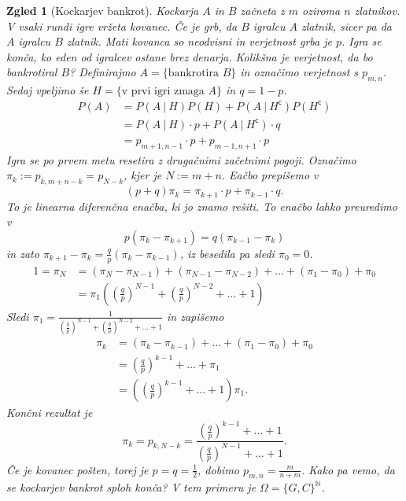 \documentclass[10pt, a4paper]{article}
\newtheorem{zgled}[izr]{Zgled}
\newcommand{\stcomp}[1]{{#1}^{\mathsf{c}}}
\newcommand{\N}{\mathbb {N}}
\begin{document}
\begin{zgled}[Kockarjev bankrot]
  Kockarja $A$ in $B$ začneta z $m$ oziroma $n$ zlatnikov.
  V vsaki rundi igre vržeta kovanec.
  Če je grb, da $B$ igralcu $A$ zlatnik, sicer pa da $A$ igralcu $B$ zlatnik.
  Mati kovanca so neodvisni in verjetnost grba je $p$.
  Igra se konča, ko eden od igralcev ostane brez denarja. Kolikšna je verjetnost, da bo bankrotiral $B$?
  Definirajmo $A = \{\text{bankrotira $B$}\}$ in označimo verjetnost s $p_{m, n}$.
  Sedaj vpeljimo še $H = \{\text{v prvi igri zmaga $A$}\}$ in $q = 1 - p$.
  \begin{align*}
    P(A) &= P(A\ |\ H) P(H) + P(A\ |\ \stcomp{H}) P(\stcomp{H})\\
    &= P(A\ |\ H) \cdot p + P(A\ |\ \stcomp{H}) \cdot q\\
    &= p_{m + 1, n - 1} \cdot p + p_{m -1, n + 1} \cdot p
  \end{align*}
  Igra se po prvem metu resetira z drugačnimi začetnimi pogoji.
  Označimo $\pi_k := p_{k, m + n - k} = p_{N - k}$, kjer je $N := m + n$.
  Eačbo prepišemo v 
  $$(p + q) \pi_k = \pi_{k + 1} \cdot p + \pi_{k - 1} \cdot q.$$
  To je linearna diferenčna enačba, ki jo znamo rešiti. To enačbo lahko preuredimo v 
  $$p( \pi_k - \pi_{k + 1})  = q (\pi_{k - 1}  - \pi_k)$$
  in zato $\pi_{k + 1} - \pi_k = \frac{q}{p} (\pi_k  - \pi_{k - 1})$, iz besedila pa sledi $\pi_0 = 0$.
  \begin{align*}
    1 = \pi_N &= (\pi_N - \pi_{N - 1}) + (\pi_{N - 1} - \pi_{N - 2}) + \dots + (\pi_1 - \pi_0) + \pi_0\\
    &= \pi_1 \left(\left(\frac{q}{p}\right)^{N - 1} + \left(\frac{q}{p}\right)^{N - 2} + \dots + 1\right)
  \end{align*}
  Sledi $\pi_1 = \frac{1}{\left(\frac{q}{p}\right)^{N - 1} + \left(\frac{q}{p}\right)^{N - 2} + \dots + 1}$
  in zapišemo 
  \begin{align*}
    \pi_k &= (\pi_k - \pi_{k - 1}) + \dots + (\pi_1 - \pi_0) + \pi_0\\
    &= \left(\frac{q}{p}\right)^{k - 1} + \dots + \pi_1\\
    &= \left(\left(\frac{q}{p}\right)^{k - 1} + \dots + 1\right) \pi_1.
  \end{align*}
  Končni rezultat je 
  $$\pi_k = p_{k, N- k} = \frac{\left(\frac{q}{p}\right)^{k - 1} + \dots + 1}{\left(\frac{q}{p}\right)^{N - 1} + \dots + 1}.$$
  Če je kovanec pošten, torej je $p = q = \frac{1}{2}$, dobimo $p_{m, n} = \frac{m}{n + m}$.
  Kako pa vemo, da se kockarjev bankrot sploh konča? V tem primeru je $\Omega = \{G, C\}^\N$.

\end{zgled}
\end{document}
